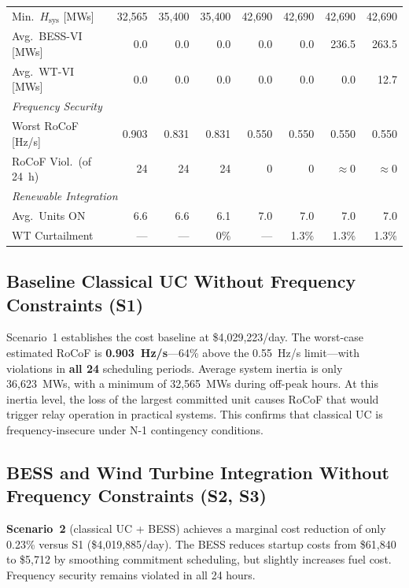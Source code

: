 \documentclass[journal]{IEEEtran}
\begin{document}
\begin{table}[!t]
\begin{tabular}{lrrrrrrr}
Min.\ $H_{\text{sys}}$ [MWs] & 32{,}565 & 35{,}400 & 35{,}400
  & 42{,}690 & 42{,}690 & 42{,}690 & 42{,}690 \\
Avg.\ BESS-VI [MWs] & 0.0 & 0.0 & 0.0 & 0.0 & 0.0 & 236.5 & 263.5 \\
Avg.\ WT-VI [MWs]   & 0.0 & 0.0 & 0.0 & 0.0 & 0.0 &   0.0 &  12.7 \\
\midrule
\multicolumn{8}{l}{\textit{Frequency Security}} \\
Worst RoCoF [Hz/s]       & 0.903 & 0.831 & 0.831 & 0.550 & 0.550
  & 0.550 & 0.550 \\
RoCoF Viol.\ (of 24~h)   &  24   &  24   &  24   &   0   &   0
  & ${\approx}$0 & ${\approx}$0 \\
\midrule
\multicolumn{8}{l}{\textit{Renewable Integration}} \\
Avg.\ Units ON  & 6.6 & 6.6 & 6.1 & 7.0 & 7.0 & 7.0 & 7.0 \\
WT Curtailment  & --- & --- & 0\% & --- & 1.3\% & 1.3\% & 1.3\% \\
\bottomrule
\end{tabular}
\end{table}

\subsection{Baseline Classical UC Without Frequency Constraints (S1)}

Scenario~1 establishes the cost baseline at \$4{,}029{,}223/day.
The worst-case estimated RoCoF is \textbf{0.903~Hz/s}---64\% above
the 0.55~Hz/s limit---with violations in \textbf{all 24} scheduling
periods. Average system inertia is only 36{,}623~MWs, with a
minimum of 32{,}565~MWs during off-peak hours. At this inertia level,
the loss of the largest committed unit causes RoCoF that would
trigger relay operation in practical systems. This confirms that
classical UC is frequency-insecure under N-1 contingency conditions.

\subsection{BESS and Wind Turbine Integration Without Frequency Constraints (S2, S3)}

\textbf{Scenario~2} (classical UC + BESS) achieves a marginal
cost reduction of only 0.23\% versus S1 (\$4{,}019{,}885/day).
The BESS reduces startup costs from \$61{,}840 to \$5{,}712 by
smoothing commitment scheduling, but slightly increases fuel cost.
Frequency security remains violated in all 24 hours.
\end{document}
